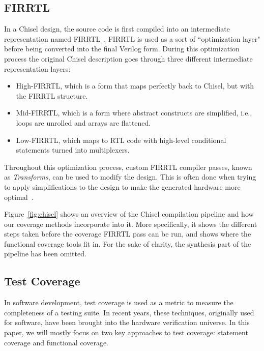 \documentclass[conference]{IEEEtran}
\begin{document}
\subsection{FIRRTL}
In a Chisel design, the source code is first compiled into an intermediate representation named FIRRTL~\cite{firrtl}.
FIRRTL is used as a sort of ``optimization layer" before being converted into the final Verilog form. 
During this optimization process the original Chisel description goes through three different intermediate representation layers:
\begin{itemize}
\item High-FIRRTL, which is a form that maps perfectly back to Chisel, but with the FIRRTL structure.
\item Mid-FIRRTL, which is a form where abstract constructs are simplified, i.e., loops are unrolled and arrays are flattened.
\item Low-FIRRTL, which maps to RTL code with high-level conditional statements turned into multiplexers.
\end{itemize}
Throughout this optimization process, custom FIRRTL compiler passes, known as \textit{Transforms}, can be used to modify the design. 
This is often done when trying to apply simplifications to the design to make the generated hardware more optimal~\cite{firrtl}.  

Figure~\ref{fig:chisel} shows an overview of the Chisel compilation pipeline and how our coverage methods incorporate into it. More specifically, it shows the different steps taken before the coverage FIRRTL pass can be run, and shows where the functional coverage tools fit in. For the sake of clarity, the synthesis part of the pipeline has been omitted.

\subsection{Test Coverage}
In software development, test coverage is used as a metric to measure the completeness of a testing suite. 
In recent years, these techniques, originally used for software, have been brought into the hardware verification universe. 
In this paper, we will mostly focus on two key approaches to test coverage: statement coverage and functional coverage. 
\end{document}
